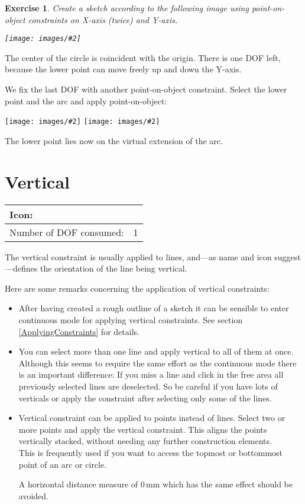 \documentclass[12pt,titlepage]{article}
\newcommand{\icon}[1]{\raisebox{-1em}{\rule{0pt}{27pt}\texttt{[image: images/\#1]}}}
\newcommand{\img}[2]{\vspace{2ex}\noindent\texttt{[image: images/\#2]}}
\newcommand{\dofConsumed}{Number of DOF consumed:}
\newtheorem{Exercise}{Exercise}
\begin{document}
\begin{Exercise} Create a sketch according to the following image using point-on-object constraints on X-axis (twice) and Y-axis.
	
	\img{}{PointOnLine1} \end{Exercise}

The center of the circle is coincident with the origin. There is one DOF left, because the lower point can move freely up and down the Y-axis.

We fix the last DOF with another point-on-object constraint. Select the lower point and the arc and apply point-on-object:

\img{height=5cm}{PointOnLine2} \hspace{1cm} \raisebox{2cm}{$\stackrel{\icon{Constraint_PointOnObject}}{\longrightarrow}$} \hspace{1cm} \img{height=5cm}{PointOnLine3}

The lower point lies now on the virtual extension of the arc.


\section{Vertical} \label{Vertical} \begin{tabular}{|l|l|} \hline Icon: & \icon{Constraint_Vertical}\\ \hline \dofConsumed & 1 \\ \hline \end{tabular}

The vertical constraint is usually applied to lines, and---as name and icon suggest---defines the orientation of the line being vertical.

Here are some remarks concerning the application of vertical constraints:


\begin{itemize} 
\item After having created a rough outline of a sketch it can be sensible to enter continuous mode for applying vertical constraints. See section \vref{ApplyingConstraints} for details. 
\item You can select more than one line and apply vertical to all of them at once. Although this seems to require the same effort as the continuous mode there is an important difference: If you miss a line and click in the free area all previously selected lines are deselected. So be careful if you have lots of verticals or apply the constraint after selecting only some of the lines. 
\item Vertical constraint can be applied to points instead of lines. Select two or more points and apply the vertical constraint. This aligns the points vertically stacked, without needing any further construction elements.\\ This is frequently used if you want to access the topmost or bottommost point of an arc or circle.
	
	A horizontal distance measure of 0\,mm which has the same effect should be avoided. 
\end{itemize} 
\end{document}
